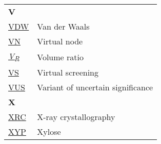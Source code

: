 \begin{longtable}[l]{@{}p{2.5cm}p{12cm}@{}}
\textbf{\large V} & \\[0.25cm]
\textmd{\href{https://en.wikipedia.org/wiki/Van_der_Waals_force}{VDW}} & Van der Waals \\
\textmd{\href{https://arxiv.org/abs/2404.07194}{VN}} & Virtual node \\
\textmd{\href{https://jcheminf.biomedcentral.com/articles/10.1186/s13321-024-00923-z}{\textit{V\textsubscript{R}}}} & Volume ratio \\
\textmd{\href{https://en.wikipedia.org/wiki/Virtual_screening}{VS}} & Virtual screening \\
\textmd{\href{https://en.wikipedia.org/wiki/Variant_of_uncertain_significance}{VUS}} & Variant of uncertain significance \\[0.3175cm]
\textbf{\large X} & \\[0.25cm]
\textmd{\href{https://en.wikipedia.org/wiki/X-ray_crystallography}{XRC}} & X-ray crystallography \\
\textmd{\href{https://www.ebi.ac.uk/pdbe-srv/pdbechem/chemicalCompound/show/XYP}{XYP}} & Xylose \\[0.3175cm]

\end{longtable}
